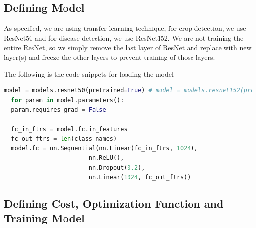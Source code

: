 \documentclass[../Report.tex]{subfiles}
\begin{document}
\subsection{Defining Model}

As specified, we are using transfer learning technique, for crop detection, we use ResNet50 and for disease detection, we use ResNet152.
We are not training the entire ResNet, so we simply remove the last layer of ResNet and replace with new layer(s) and freeze the other 
layers to prevent training of those layers.

The following is the code snippets for loading the model
\begin{lstlisting}[language=python,caption={Defining Model},captionpos=b]
  model = models.resnet50(pretrained=True) # model = models.resnet152(pretrained=True) (for disease detection)
  for param in model.parameters():
  param.requires_grad = False

  fc_in_ftrs = model.fc.in_features
  fc_out_ftrs = len(class_names)
  model.fc = nn.Sequential(nn.Linear(fc_in_ftrs, 1024),
                        nn.ReLU(),
                        nn.Dropout(0.2),
                        nn.Linear(1024, fc_out_ftrs))
\end{lstlisting}

\subsection{Defining Cost, Optimization Function and Training Model}
\end{document}
